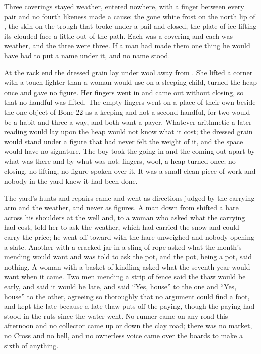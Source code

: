 Three coverings stayed weather, entered nowhere, with a finger between every pair and no fourth likeness made a cause: the gone white frost on the north lip of , the skin on the trough that broke under a pail and closed, the plate of ice lifting its clouded face a little out of the path. Each was a covering and each was weather, and the three were three. If a man had made them one thing he would have had to put a name under it, and no name stood.

At the rack end the dressed grain lay under wool away from . She lifted a corner with a touch lighter than a woman would use on a sleeping child, turned the heap once and gave no figure. Her fingers went in and came out without closing, so that no handful was lifted. The empty fingers went on a place of their own beside the one object of Bone 22 as a keeping and not a second handful, for two would be a habit and three a way, and both want a payer. Whatever arithmetic a later reading would lay upon the heap would not know what it cost; the dressed grain would stand under a figure that had never felt the weight of it, and the space would have no signature. The boy took the going-in and the coming-out apart by what was there and by what was not: fingers, wool, a heap turned once; no closing, no lifting, no figure spoken over it. It was a small clean piece of work and nobody in the yard knew it had been done.

The yard’s hunts and repairs came and went as directions judged by the carrying arm and the weather, and never as figures. A man down from  shifted a hare across his shoulders at the well and, to a woman who asked what the carrying had cost, told her to ask the weather, which had carried the snow and could carry the price; he went off toward  with the hare unweighed and nobody opening a slate. Another with a cracked jar in a sling of rope asked what the month’s mending would want and was told to ask the pot, and the pot, being a pot, said nothing. A woman with a basket of kindling asked what the seventh year would want when it came. Two men mending a strip of fence said the thaw would be early, and said it would be late, and  said “Yes, house” to the one and “Yes, house” to the other, agreeing so thoroughly that no argument could find a foot, and kept the late because a late thaw puts off the paying, though the paying had stood in the ruts since the water went. No runner came on any road this afternoon and no collector came up or down the clay road; there was no market, no Cross and no bell, and no ownerless voice came over the boards to make a sixth of anything.

